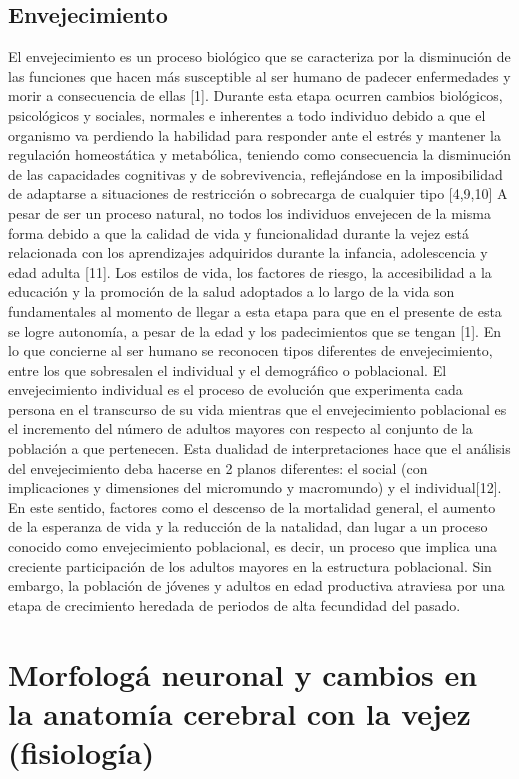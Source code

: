 \subsection{ Envejecimiento}
	El envejecimiento es un proceso biológico que se caracteriza por la disminución de las funciones que hacen más susceptible al ser humano de padecer enfermedades y morir a consecuencia de ellas [1]. Durante esta etapa ocurren cambios biológicos, psicológicos y sociales, normales e inherentes a todo individuo debido a que el organismo va perdiendo la habilidad para responder ante el estrés y mantener la regulación homeostática y metabólica, teniendo como consecuencia la disminución de las capacidades cognitivas y de sobrevivencia, reflejándose en la imposibilidad de adaptarse a situaciones de restricción o sobrecarga de cualquier tipo [4,9,10]
	A pesar de ser un proceso natural, no todos los individuos envejecen de la misma forma debido a que la calidad de vida y funcionalidad durante la vejez está relacionada con los aprendizajes adquiridos durante la infancia, adolescencia y edad adulta [11]. Los estilos de vida, los factores de riesgo, la accesibilidad a la educación y la promoción de la salud adoptados a lo largo de la vida son fundamentales al momento de llegar a esta etapa para que en el presente de esta se logre autonomía, a pesar de la edad y los padecimientos que se tengan [1].
	En lo que concierne al ser humano se reconocen tipos diferentes de envejecimiento, entre los que sobresalen el individual y el demográfico o poblacional. El envejecimiento individual es el proceso de evolución que experimenta cada persona en el transcurso de su vida mientras que el envejecimiento poblacional es el incremento del número de adultos mayores con respecto al conjunto de la población a que pertenecen. Esta dualidad de interpretaciones hace que el análisis del envejecimiento deba hacerse en 2 planos diferentes: el social (con implicaciones y dimensiones del micromundo y macromundo) y el individual[12].
	En este sentido, factores como el descenso de la mortalidad general, el aumento de la esperanza de vida y la reducción de la natalidad, dan lugar a un proceso conocido como envejecimiento poblacional, es decir, un proceso que implica una creciente participación de los adultos mayores en la estructura poblacional. Sin embargo, la población de jóvenes y adultos en edad productiva atraviesa por una etapa de crecimiento heredada de periodos de alta fecundidad del pasado.


\section{Morfolog\'a neuronal y cambios en la anatomía cerebral con la vejez (fisiolog\'ia)}

